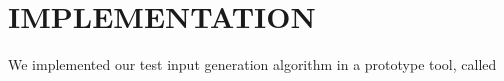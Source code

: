 \section{IMPLEMENTATION}
We implemented our test input generation algorithm in a prototype tool, called 